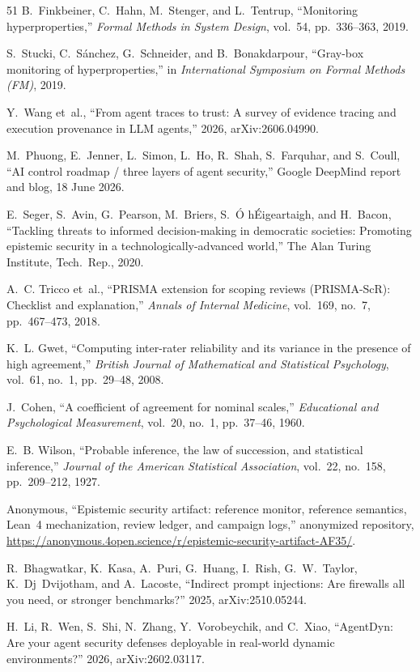 \documentclass[conference,compsoc]{IEEEtran}
\theoremstyle{definition}
\theoremstyle{plain}
\begin{document}
\begin{thebibliography}{51}
 B.~Finkbeiner, C.~Hahn, M.~Stenger, and
L.~Tentrup, ``Monitoring hyperproperties,'' \emph{Formal Methods
in System Design}, vol.~54, pp.~336--363, 2019.

 S.~Stucki, C.~S\'anchez, G.~Schneider, and
B.~Bonakdarpour, ``Gray-box monitoring of hyperproperties,'' in
\emph{International Symposium on Formal Methods (FM)}, 2019.

 Y.~Wang et~al., ``From agent traces to trust: A
survey of evidence tracing and execution provenance in LLM
agents,'' 2026, arXiv:2606.04990.

 M.~Phuong, E.~Jenner, L.~Simon, L.~Ho,
R.~Shah, S.~Farquhar, and S.~Coull, ``AI control roadmap / three
layers of agent security,'' Google DeepMind report and blog, 18
June 2026.

 E.~Seger, S.~Avin, G.~Pearson, M.~Briers,
S.~\'O h\'Eigeartaigh, and H.~Bacon, ``Tackling threats to
informed decision-making in democratic societies: Promoting
epistemic security in a technologically-advanced world,'' The Alan
Turing Institute, Tech.\ Rep., 2020.

 A.~C. Tricco et~al., ``PRISMA extension for
scoping reviews (PRISMA-ScR): Checklist and explanation,''
\emph{Annals of Internal Medicine}, vol.~169, no.~7,
pp.~467--473, 2018.

 K.~L. Gwet, ``Computing inter-rater reliability and
its variance in the presence of high agreement,'' \emph{British
Journal of Mathematical and Statistical Psychology}, vol.~61,
no.~1, pp.~29--48, 2008.

 J.~Cohen, ``A coefficient of agreement for nominal
scales,'' \emph{Educational and Psychological Measurement},
vol.~20, no.~1, pp.~37--46, 1960.

 E.~B. Wilson, ``Probable inference, the law of
succession, and statistical inference,'' \emph{Journal of the
American Statistical Association}, vol.~22, no.~158,
pp.~209--212, 1927.

 Anonymous, ``Epistemic security artifact: reference
monitor, reference semantics, Lean~4 mechanization, review ledger, and
campaign logs,'' anonymized repository,
\url{https://anonymous.4open.science/r/epistemic-security-artifact-AF35/}.

 R.~Bhagwatkar, K.~Kasa, A.~Puri,
G.~Huang, I.~Rish, G.~W.~Taylor, K.~Dj~Dvijotham, and A.~Lacoste,
``Indirect prompt injections: Are firewalls all you need, or stronger
benchmarks?'' 2025, arXiv:2510.05244.

 H.~Li, R.~Wen, S.~Shi, N.~Zhang, Y.~Vorobeychik, and
C.~Xiao, ``AgentDyn: Are your agent security defenses deployable in
real-world dynamic environments?'' 2026, arXiv:2602.03117.

\end{thebibliography}
\end{document}
